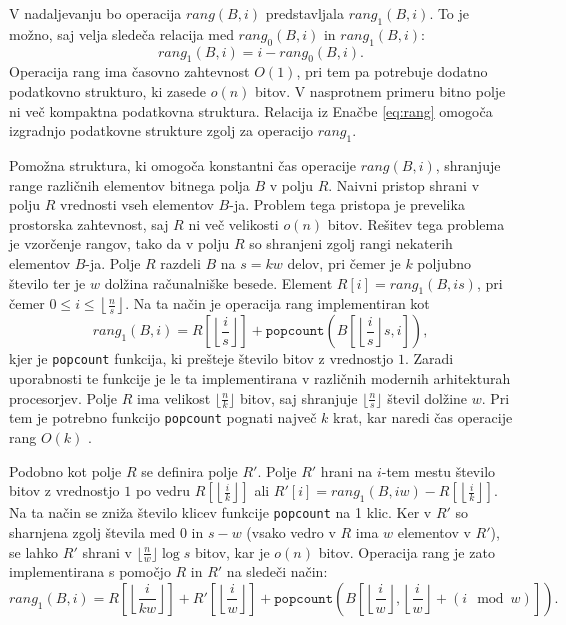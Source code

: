 V nadaljevanju bo operacija $rang(B,i)$ predstavljala $rang_1(B,i)$. To je možno, saj velja sledeča relacija med $rang_0(B,i)$ in $rang_1(B,i)$:
\begin{equation}\label{eq:rang}
    rang_1(B,i)=i-rang_0(B,i).
\end{equation}
 Operacija rang ima časovno zahtevnost $O(1)$, pri tem pa potrebuje dodatno podatkovno strukturo, ki zasede $o(n)$ bitov. V nasprotnem primeru bitno polje ni več kompaktna podatkovna struktura. Relacija iz Enačbe \ref{eq:rang} omogoča izgradnjo podatkovne strukture zgolj za operacijo $rang_1$.

Pomožna struktura, ki omogoča konstantni čas operacije $rang(B,i)$, shranjuje range različnih elementov bitnega polja $B$ v polju $R$. Naivni pristop shrani v polju $R$ vrednosti vseh elementov $B$-ja. Problem tega pristopa je prevelika prostorska zahtevnost, saj $R$ ni več velikosti $o(n)$ bitov. Rešitev tega problema je vzorčenje rangov, tako da v polju $R$ so shranjeni zgolj rangi nekaterih elementov $B$-ja. Polje $R$ razdeli $B$ na $s=kw$ delov, pri čemer je $k$ poljubno število ter je $w$ dolžina računalniške besede. Element $R[i]=rang_1(B,is)$, pri čemer $0\le i \le \left\lfloor\frac{n}{s} \right\rfloor$. Na ta način je operacija rang implementiran kot 
\begin{equation}
    rang_1(B,i)=R\left[\left\lfloor\frac{i}{s} \right\rfloor\right] + \texttt{popcount}\left(B\left[\left\lfloor\frac{i}{s} \right\rfloor s,i\right]\right),
\end{equation}
kjer je \texttt{popcount} funkcija, ki prešteje število bitov z vrednostjo $1$. Zaradi uporabnosti te funkcije je le ta implementirana v različnih modernih arhitekturah procesorjev. Polje $R$ ima velikost $\lfloor\frac{n}{k}\rfloor$ bitov, saj shranjuje $\lfloor\frac{n}{s}\rfloor$ števil dolžine $w$. Pri tem je potrebno funkcijo \texttt{popcount} pognati največ $k$ krat, kar naredi čas operacije rang $O(k)$ \cite{Navarro2016}.

Podobno kot polje $R$ se definira polje $R'$. Polje $R'$ hrani na $i$-tem mestu število bitov z vrednostjo $1$ po vedru $R[\left\lfloor\frac{i}{k} \right\rfloor]$ ali $R'[i]=rang_1(B,iw)-R[\left\lfloor\frac{i}{k} \right\rfloor]$. Na ta način se zniža število klicev funkcije \texttt{popcount} na 1 klic. Ker v $R'$ so sharnjena zgolj števila med 0 in $s-w$ (vsako vedro v $R$ ima $w$ elementov v $R'$), se lahko $R'$ shrani v $\lfloor\frac{n}{w}\rfloor\log{s}$ bitov, kar je $o(n)$ bitov. Operacija rang je zato implementirana s pomočjo $R$ in $R'$ na sledeči način:
\begin{equation}
    rang_1(B,i)=R\left[\left\lfloor\frac{i}{kw} \right\rfloor\right]+ R'\left[\left\lfloor\frac{i}{w} \right\rfloor\right]+\texttt{popcount}\left(B\left[\left\lfloor\frac{i}{w} \right\rfloor,\left\lfloor\frac{i}{w} \right\rfloor+(i \mod w)\right]\right).
\end{equation}

